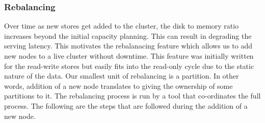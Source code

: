 \subsubsection{Rebalancing}
\label{sec:read_only:data_cycle:rebalancing}

Over time as new stores get added to the cluster, the disk to memory
ratio increases beyond the initial capacity planning. This can result
in degrading the serving latency. This motivates the rebalanacing 
feature which allows us to add new nodes to a live cluster without 
downtime. This feature was initially written for the read-write stores but easily
fits into the read-only cycle due to the static nature of the data.
Our smallest unit of rebalancing is a partition. In other words,
addition of a new node translates to giving the ownership of some
partitions to it. The rebalancing process is run by a tool that 
co-ordinates the full process. The following are the steps that
are followed during the addition of a new node. 

